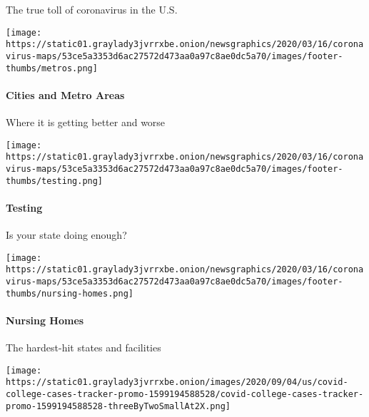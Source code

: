 The true toll of coronavirus in the U.S.

\href{https://www.nytimes3xbfgragh.onion/interactive/2020/04/23/upshot/five-ways-to-monitor-coronavirus-outbreak-us.html}{}

\texttt{[image: https://static01.graylady3jvrrxbe.onion/newsgraphics/2020/03/16/coronavirus-maps/53ce5a3353d6ac27572d473aa0a97c8ae0dc5a70/images/footer-thumbs/metros.png]}

\hypertarget{cities-and-metro-areas}{%
\paragraph{Cities and Metro Areas}\label{cities-and-metro-areas}}

Where it is getting better and worse

\href{https://www.nytimes3xbfgragh.onion/interactive/2020/us/coronavirus-testing.html}{}

\texttt{[image: https://static01.graylady3jvrrxbe.onion/newsgraphics/2020/03/16/coronavirus-maps/53ce5a3353d6ac27572d473aa0a97c8ae0dc5a70/images/footer-thumbs/testing.png]}

\hypertarget{testing}{%
\paragraph{Testing}\label{testing}}

Is your state doing enough?

\href{https://www.nytimes3xbfgragh.onion/interactive/2020/us/coronavirus-nursing-homes.html}{}

\texttt{[image: https://static01.graylady3jvrrxbe.onion/newsgraphics/2020/03/16/coronavirus-maps/53ce5a3353d6ac27572d473aa0a97c8ae0dc5a70/images/footer-thumbs/nursing-homes.png]}

\hypertarget{nursing-homes}{%
\paragraph{Nursing Homes}\label{nursing-homes}}

The hardest-hit states and facilities

\href{https://www.nytimes3xbfgragh.onion/interactive/2020/us/covid-college-cases-tracker.html}{}

\texttt{[image: https://static01.graylady3jvrrxbe.onion/images/2020/09/04/us/covid-college-cases-tracker-promo-1599194588528/covid-college-cases-tracker-promo-1599194588528-threeByTwoSmallAt2X.png]}

